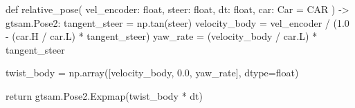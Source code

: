 \begin{pythoncode}
def relative_pose(
    vel_encoder: float, steer: float, dt: float, car: Car = CAR
) -> gtsam.Pose2:
    tangent_steer = np.tan(steer)
    velocity_body = vel_encoder / (1.0 - (car.H / car.L) * tangent_steer)
    yaw_rate = (velocity_body / car.L) * tangent_steer

    twist_body = np.array([velocity_body, 0.0, yaw_rate], dtype=float)

    return gtsam.Pose2.Expmap(twist_body * dt)
\end{pythoncode}
